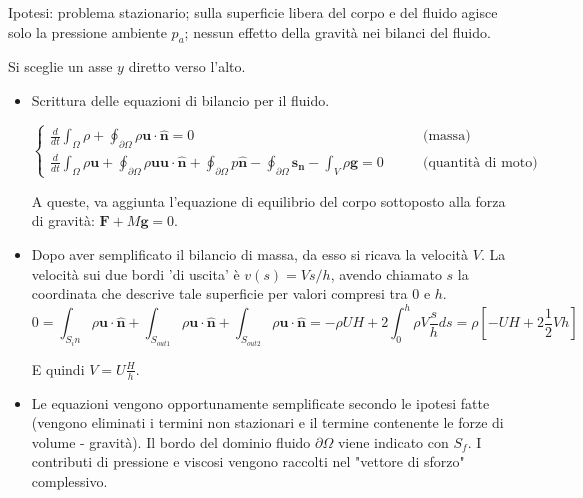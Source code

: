 \parttwo
 Ipotesi: problema stazionario; sulla superficie libera del corpo e del fluido agisce solo la pressione ambiente $p_a$; nessun effetto della gravità nei bilanci del fluido.

Si sceglie un asse $y$ diretto verso l'alto.

\begin{itemize}
 \item Scrittura delle equazioni di bilancio per il fluido.
 
   \begin{equation}
     \begin{cases}
       \frac{d}{d t} \int_{\Omega} \rho + \oint_{\partial \Omega} \rho \bm{u} \cdot \hat{\bm{n}} = 0 & \qquad \text{(massa)} \\
       \frac{d}{d t} \int_{\Omega} \rho \bm{u} + \oint_{\partial \Omega} \rho \bm{u} \bm{u} \cdot \hat{\bm{n}} +
        \oint_{\partial \Omega} p \hat{\bm{n}} - \oint_{\partial \Omega} \bm{s_n} 
        -\int_V \rho \bm{g} = 0  
        & \qquad \text{(quantità di moto)}  %
      \end{cases}
    \end{equation}

A queste, va aggiunta l'equazione di equilibrio del corpo sottoposto alla forza di gravità: $\bm{F} + M \bm {g} = 0$.

\item Dopo aver semplificato il bilancio di massa, da esso si ricava la velocità $V$. La velocità
 sui due
bordi 'di uscita' è $v(s) = V s/h$, avendo chiamato $s$ la coordinata che descrive tale superficie per valori compresi tra $0$ e $h$.
\begin{equation}
  0 = \int_{S_in} \rho \bm{u} \cdot \bm{\hat{n}} +   \int_{S_{out1}} \rho \bm{u} \cdot \bm{\hat{n}} +
  \int_{S_{out2}} \rho \bm{u} \cdot \bm{\hat{n}} = 
  - \rho U H + 2 \int_0^h \rho V \frac{s}{h} ds = \rho \displaystyle\left[
- U H + 2 \frac{1}{2} V h\right]
\end{equation}

E quindi $V = U \frac{H}{h}$.

 \item Le equazioni vengono opportunamente semplificate secondo le ipotesi fatte (vengono eliminati i termini non stazionari e il termine contenente le forze di volume - gravità). Il bordo del dominio fluido $\partial \Omega$ viene indicato con $S_f$. I contributi di pressione e viscosi vengono raccolti nel "vettore di sforzo" complessivo.



\end{itemize}
